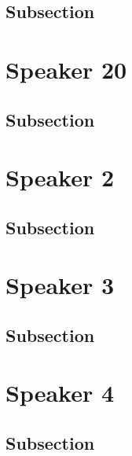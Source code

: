 \documentclass[
]{book}
\begin{document}
\hypertarget{subsection-13}{%
\section{Subsection}\label{subsection-13}}

\hypertarget{speaker-20-1}{%
\chapter*{Speaker 20}\label{speaker-20-1}}

\hypertarget{subsection-14}{%
\section{Subsection}\label{subsection-14}}

\hypertarget{speaker-2}{%
\chapter*{Speaker 2}\label{speaker-2}}

\hypertarget{subsection-15}{%
\section{Subsection}\label{subsection-15}}

\hypertarget{speaker-3}{%
\chapter*{Speaker 3}\label{speaker-3}}

\hypertarget{subsection-16}{%
\section{Subsection}\label{subsection-16}}

\hypertarget{speaker-4}{%
\chapter*{Speaker 4}\label{speaker-4}}

\hypertarget{subsection-17}{%
\section{Subsection}\label{subsection-17}}
\end{document}
